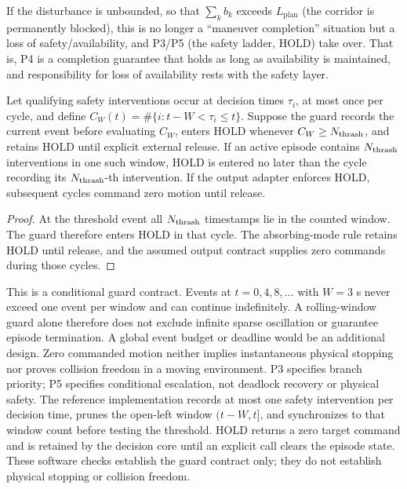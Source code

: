 \begin{remark}
If the disturbance is unbounded, so that $\sum_k b_k$ exceeds $L_{\text{plan}}$ (the corridor is permanently blocked), this is no longer a ``maneuver completion'' situation but a loss of safety/availability, and P3/P5 (the safety ladder, HOLD) take over. That is, P4 is a completion guarantee that holds as long as availability is maintained, and responsibility for loss of availability rests with the safety layer.
\end{remark}

\begin{proposition} \label{prop:p5}
Let qualifying safety interventions occur at decision times $\tau_i$, at most once per cycle, and define $C_W(t)=\#\{i:t-W<\tau_i\le t\}$. Suppose the guard records the current event before evaluating $C_W$, enters HOLD whenever $C_W\ge N_{\rm thrash}$, and retains HOLD until explicit external release. If an active episode contains $N_{\rm thrash}$ interventions in one such window, HOLD is entered no later than the cycle recording its $N_{\rm thrash}$-th intervention. If the output adapter enforces HOLD, subsequent cycles command zero motion until release.
\end{proposition}

\begin{proof}
At the threshold event all $N_{\rm thrash}$ timestamps lie in the counted window. The guard therefore enters HOLD in that cycle. The absorbing-mode rule retains HOLD until release, and the assumed output contract supplies zero commands during those cycles.
\end{proof}

\begin{remark}
This is a conditional guard contract. Events at $t=0,4,8,\ldots$ with $W=3$ s never exceed one event per window and can continue indefinitely. A rolling-window guard alone therefore does not exclude infinite sparse oscillation or guarantee episode termination. A global event budget or deadline would be an additional design. Zero commanded motion neither implies instantaneous physical stopping nor proves collision freedom in a moving environment. P3 specifies branch priority; P5 specifies conditional escalation, not deadlock recovery or physical safety.
The reference implementation records at most one safety intervention per decision time, prunes the open-left window $(t-W,t]$, and synchronizes  to that window count before testing the threshold. HOLD returns a zero target command and is retained by the decision core until an explicit  call clears the episode state. These software checks establish the guard contract only; they do not establish physical stopping or collision freedom.
\end{remark}


